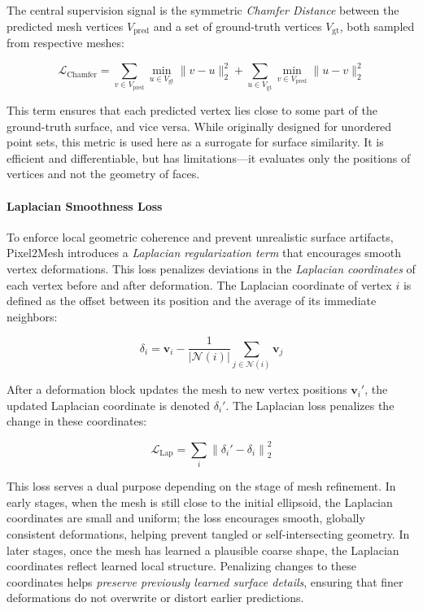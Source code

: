 The central supervision signal is the symmetric \emph{Chamfer Distance} between the predicted mesh vertices \( V_{\text{pred}} \) and a set of ground-truth vertices \( V_{\text{gt}} \), both sampled from respective meshes:

\[
\mathcal{L}_{\text{Chamfer}} = \sum_{v \in V_{\text{pred}}} \min_{u \in V_{\text{gt}}} \|v - u\|_2^2 + \sum_{u \in V_{\text{gt}}} \min_{v \in V_{\text{pred}}} \|u - v\|_2^2
\]

This term ensures that each predicted vertex lies close to some part of the ground-truth surface, and vice versa. While originally designed for unordered point sets, this metric is used here as a surrogate for surface similarity. It is efficient and differentiable, but has limitations—it evaluates only the positions of vertices and not the geometry of faces.

\paragraph{Laplacian Smoothness Loss}

To enforce local geometric coherence and prevent unrealistic surface artifacts, Pixel2Mesh introduces a \emph{Laplacian regularization term} that encourages smooth vertex deformations. This loss penalizes deviations in the \emph{Laplacian coordinates} of each vertex before and after deformation. The Laplacian coordinate of vertex \( i \) is defined as the offset between its position and the average of its immediate neighbors:

\[
\delta_i = \mathbf{v}_i - \frac{1}{|\mathcal{N}(i)|} \sum_{j \in \mathcal{N}(i)} \mathbf{v}_j
\]

After a deformation block updates the mesh to new vertex positions \( \mathbf{v}_i' \), the updated Laplacian coordinate is denoted \( \delta_i' \). The Laplacian loss penalizes the change in these coordinates:

\[
\mathcal{L}_{\text{Lap}} = \sum_i \left\| \delta_i' - \delta_i \right\|_2^2
\]

This loss serves a dual purpose depending on the stage of mesh refinement. In early stages, when the mesh is still close to the initial ellipsoid, the Laplacian coordinates are small and uniform; the loss encourages smooth, globally consistent deformations, helping prevent tangled or self-intersecting geometry. In later stages, once the mesh has learned a plausible coarse shape, the Laplacian coordinates reflect learned local structure. Penalizing changes to these coordinates helps \emph{preserve previously learned surface details}, ensuring that finer deformations do not overwrite or distort earlier predictions.

